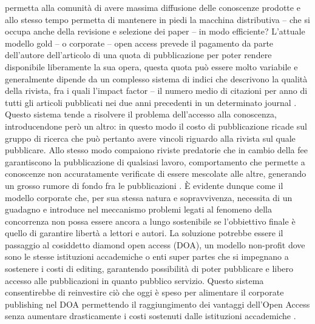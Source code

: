 permetta alla comunità di avere massima diffusione delle conoscenze prodotte e allo stesso
tempo permetta di mantenere in piedi la macchina distributiva – che si occupa anche della
revisione e selezione dei paper – in modo efficiente? L’attuale modello gold – o corporate –
open access prevede il pagamento da parte dell’autore dell’articolo di una quota di
pubblicazione per poter rendere disponibile liberamente la sua opera, questa quota può
essere molto variabile e generalmente dipende da un complesso sistema di indici che
descrivono la qualità della rivista, fra i quali l’impact factor – il numero medio di citazioni per
anno di tutti gli articoli pubblicati nei due anni precedenti in un determinato journal \parencite{vanNoorden}.
Questo sistema tende a risolvere il problema dell’accesso alla conoscenza,
introducendone però un altro: in questo modo il costo di pubblicazione ricade sul gruppo di
ricerca che può pertanto avere vincoli riguardo alla rivista sul quale pubblicare. Allo stesso
modo compaiono riviste predatorie che in cambio della fee garantiscono la pubblicazione di
qualsiasi lavoro, comportamento che permette a conoscenze non accuratamente verificate
di essere mescolate alle altre, generando un grosso rumore di fondo fra le pubblicazioni \parencite{beall2013, beall2012}.
È evidente dunque come il modello corporate che, per sua stessa natura
e sopravvivenza, necessita di un guadagno e introduce nel meccanismo problemi legati al
fenomeno della concorrenza non possa essere ancora a lungo sostenibile se l’obbiettivo
finale è quello di garantire libertà a lettori e autori. La soluzione potrebbe essere il passaggio
al cosiddetto diamond open access (DOA), un modello non-profit dove sono le stesse
istituzioni accademiche o enti super partes che si impegnano a sostenere i costi di editing,
garantendo possibilità di poter pubblicare e libero accesso alle pubblicazioni in quanto
pubblico servizio. Questo sistema consentirebbe di reinvestire ciò che oggi è speso per
alimentare il corporate publishing nel DOA permettendo il raggiungimento dei vantaggi
dell’Open Access senza aumentare drasticamente i costi sostenuti dalle istituzioni
accademiche \parencite{fuchs}.